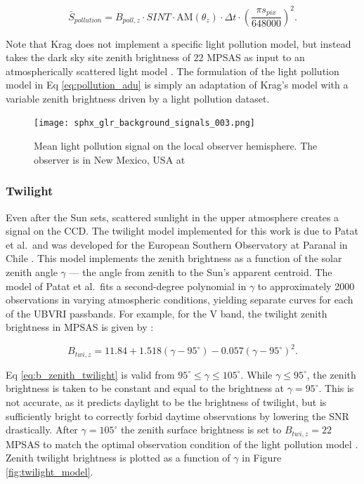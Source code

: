 \begin{equation} \label{eq:pollution_adu}
  \bar{S}_{pollution} = B_{poll,z} \cdot SINT \cdot \textrm{AM}(\theta_z) \cdot \Delta t \cdot \left( \frac{\pi s_{pix}}{648000} \right)^2.
\end{equation}

Note that Krag does not implement a specific light pollution model, but instead takes the dark sky site zenith brightness of $22$ MPSAS as input to an atmospherically scattered light model \cite{krag2003}. The formulation of the light pollution model in Eq \ref{eq:pollution_adu} is simply an adaptation of Krag's model with a variable zenith brightness driven by a light pollution dataset.

\begin{figure}[ht]
  \centering
  \texttt{[image: sphx\_glr\_background\_signals\_003.png]}
  \caption{Mean light pollution signal on the local observer hemisphere. The observer is in New Mexico, USA at
  \pogslla}
  \label{fig:pollution_hemi}
\end{figure}

\subsubsection{Twilight}

Even after the Sun sets, scattered sunlight in the upper atmosphere creates a signal on the CCD. The twilight model implemented for this work is due to Patat et al.\ and was developed for the European Southern Observatory at Paranal in Chile \cite{patat2006}. This model implements the zenith brightness as a function of the solar zenith angle $\gamma$ --- the angle from zenith to the Sun's apparent centroid. The model of Patat et al.\ fits a second-degree polynomial in $\gamma$ to approximately 2000 observations in varying atmospheric conditions, yielding separate curves for each of the UBVRI passbands. For example, for the V band, the twilight zenith brightness in MPSAS is given by \cite{patat2006}:

\begin{equation} \label{eq:b_zenith_twilight}
  B_{twi,z} = 11.84 + 1.518(\gamma - 95^\circ) - 0.057 (\gamma -  95^\circ)^2.
\end{equation}

Eq \ref{eq:b_zenith_twilight} is valid from $95^\circ \leq \gamma \leq 105^\circ$. While $\gamma \le 95^\circ$, the zenith brightness is taken to be constant and equal to the brightness at $\gamma = 95^\circ$. This is not accurate, as it predicts daylight to be the brightness of twilight, but is sufficiently bright to correctly forbid daytime observations by lowering the SNR drastically. After $\gamma = 105^\circ$ the zenith surface brightness is set to $B_{twi,z} = 22$ MPSAS to match the optimal observation condition of the light pollution model \cite{krag2003}. Zenith twilight brightness is plotted as a function of $\gamma$ in Figure \ref{fig:twilight_model}.

